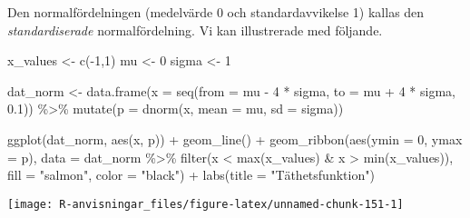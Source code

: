 \documentclass[
]{book}
\newenvironment{Shaded}{\begin{snugshade}}{\end{snugshade}}
\newcommand{\AttributeTok}[1]{\textcolor[rgb]{0.77,0.63,0.00}{#1}}
\newcommand{\DecValTok}[1]{\textcolor[rgb]{0.00,0.00,0.81}{#1}}
\newcommand{\FloatTok}[1]{\textcolor[rgb]{0.00,0.00,0.81}{#1}}
\newcommand{\FunctionTok}[1]{\textcolor[rgb]{0.00,0.00,0.00}{#1}}
\newcommand{\NormalTok}[1]{#1}
\newcommand{\OtherTok}[1]{\textcolor[rgb]{0.56,0.35,0.01}{#1}}
\newcommand{\SpecialCharTok}[1]{\textcolor[rgb]{0.00,0.00,0.00}{#1}}
\newcommand{\StringTok}[1]{\textcolor[rgb]{0.31,0.60,0.02}{#1}}
\theoremstyle{definition}
\theoremstyle{definition}
\theoremstyle{definition}
\theoremstyle{definition}
\theoremstyle{remark}
\begin{document}
Den normalfördelningen (medelvärde 0 och standardavvikelse 1) kallas den \emph{standardiserade} normalfördelning. Vi kan illustrerade med följande.

\begin{Shaded}
\begin{Highlighting}[]
\NormalTok{x\_values }\OtherTok{\textless{}{-}} \FunctionTok{c}\NormalTok{(}\SpecialCharTok{{-}}\DecValTok{1}\NormalTok{,}\DecValTok{1}\NormalTok{)}
\NormalTok{mu }\OtherTok{\textless{}{-}} \DecValTok{0}
\NormalTok{sigma }\OtherTok{\textless{}{-}} \DecValTok{1}

\NormalTok{dat\_norm }\OtherTok{\textless{}{-}} \FunctionTok{data.frame}\NormalTok{(}\AttributeTok{x =} \FunctionTok{seq}\NormalTok{(}\AttributeTok{from =}\NormalTok{ mu }\SpecialCharTok{{-}} \DecValTok{4} \SpecialCharTok{*}\NormalTok{ sigma, }\AttributeTok{to =}\NormalTok{ mu }\SpecialCharTok{+} \DecValTok{4} \SpecialCharTok{*}\NormalTok{ sigma, }\FloatTok{0.1}\NormalTok{)) }\SpecialCharTok{\%\textgreater{}\%} 
  \FunctionTok{mutate}\NormalTok{(}\AttributeTok{p =} \FunctionTok{dnorm}\NormalTok{(x, }\AttributeTok{mean =}\NormalTok{ mu, }\AttributeTok{sd =}\NormalTok{ sigma))}

\FunctionTok{ggplot}\NormalTok{(dat\_norm, }\FunctionTok{aes}\NormalTok{(x, p)) }\SpecialCharTok{+}
  \FunctionTok{geom\_line}\NormalTok{() }\SpecialCharTok{+}
  \FunctionTok{geom\_ribbon}\NormalTok{(}\FunctionTok{aes}\NormalTok{(}\AttributeTok{ymin =} \DecValTok{0}\NormalTok{, }\AttributeTok{ymax =}\NormalTok{ p), }\AttributeTok{data =}\NormalTok{ dat\_norm }\SpecialCharTok{\%\textgreater{}\%} \FunctionTok{filter}\NormalTok{(x }\SpecialCharTok{\textless{}} \FunctionTok{max}\NormalTok{(x\_values) }\SpecialCharTok{\&}\NormalTok{ x }\SpecialCharTok{\textgreater{}} \FunctionTok{min}\NormalTok{(x\_values)), }\AttributeTok{fill =} \StringTok{"salmon"}\NormalTok{, }\AttributeTok{color =} \StringTok{"black"}\NormalTok{) }\SpecialCharTok{+}
  \FunctionTok{labs}\NormalTok{(}\AttributeTok{title =} \StringTok{"Täthetsfunktion"}\NormalTok{)}
\end{Highlighting}
\end{Shaded}

\begin{center}\texttt{[image: R-anvisningar\_files/figure-latex/unnamed-chunk-151-1]} \end{center}
\end{document}
